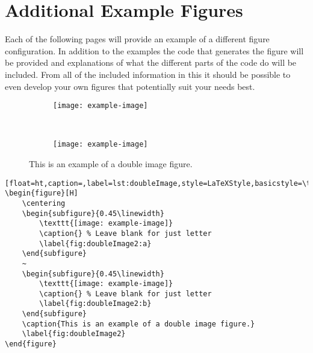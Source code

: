 \chapter{Additional Example Figures}\label{app:examplefigures}
	Each of the following pages will provide an example of a different figure configuration. 
	In addition to the examples the code that generates the figure will be provided and explanations of what the different parts of the code do will be included.
	From all of the included information in this  it should be possible to even develop your own figures that potentially suit your needs best.
		
		\clearpage



		\vspace*{\fill}
		\begin{figure}[H]
			\centering
			\begin{subfigure}{0.45\linewidth}
				\texttt{[image: example-image]}
				\caption{} %
				\label{fig:doubleImage2:a}
			\end{subfigure}
			~
			\begin{subfigure}{0.45\linewidth}
				\texttt{[image: example-image]}
				\caption{} %
				\label{fig:doubleImage2:b}
			\end{subfigure}
			\caption{This is an example of a double image figure.}
			\label{fig:doubleImage2}
		\end{figure}
		\begin{lstlisting}[float=ht,caption=,label=lst:doubleImage,style=LaTeXStyle,basicstyle=\tiny\ttfamily,]
\begin{figure}[H]
	\centering
	\begin{subfigure}{0.45\linewidth}
		\texttt{[image: example-image]}
		\caption{} % Leave blank for just letter
		\label{fig:doubleImage2:a}
	\end{subfigure}
	~
	\begin{subfigure}{0.45\linewidth}
		\texttt{[image: example-image]}
		\caption{} % Leave blank for just letter
		\label{fig:doubleImage2:b}
	\end{subfigure}
	\caption{This is an example of a double image figure.}
	\label{fig:doubleImage2}
\end{figure}
		\end{lstlisting}
		\vspace*{\fill}
		\pagebreak



